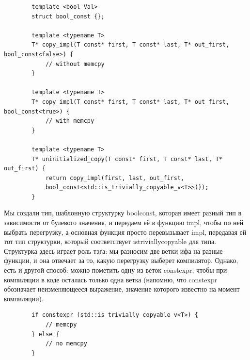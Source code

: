 \documentclass[12pt, a4paper]{article}
\begin{document}
	\begin{verbatim}
		template <bool Val>
		struct bool_const {};
		
		template <typename T>
		T* copy_impl(T const* first, T const* last, T* out_first, bool_const<false>) {
			// without memcpy
		}
		
		template <typename T>
		T* copy_impl(T const* first, T const* last, T* out_first, bool_const<true>) {
			// with memcpy
		}
		
		template <typename T>
		T* uninitialized_copy(T const* first, T const* last, T* out_first) {
			return copy_impl(first, last, out_first, 
			bool_const<std::is_trivially_copyable_v<T>>());
		}
	\end{verbatim}
	Мы создали тип, шаблонную структурку bool\textunderscore const, которая имеет разный тип в зависимости от булевого значения, и передаем её в функцию impl, чтобы по ней выбрать перегрузку, а основная функция просто перевызывает impl, передавая ей тот тип структурки, который соответствует is\textunderscore trivially\textunderscore copyable для типа. Структурка здесь играет роль тэга: мы разносим две ветки ифа на разные функции, и она отвечает за то, какую перегрузку выберет компилятор. Однако, есть и другой способ: можно пометить одну из веток constexpr, чтобы при компиляции в коде осталась только одна ветка (напомню, что constexpr обозначает неизменяющееся выражение, значение которого известно на момент компиляции).
	\begin{verbatim}
		if constexpr (std::is_trivially_copyable_v<T>) {
			// memcpy
		} else {
			// no memcpy
		}
	\end{verbatim}
\end{document}
